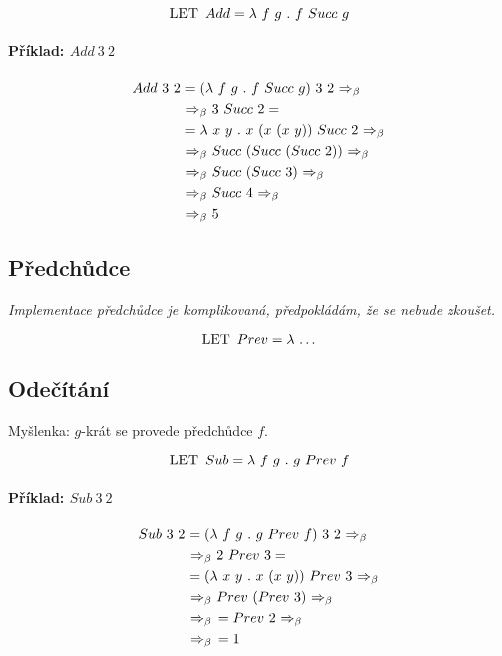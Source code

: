 $$ \lklet Add = \lk f ~ g \lkdot f ~ Succ ~ g $$

\paragraph*{Příklad: $Add ~ 3 ~ 2$}
\begin{equation}
    \begin{split}
        Add ~ 3 ~ 2 &= (\lk f ~ g \lkdot f ~ Succ ~ g) ~ 3 ~ 2 \lkbeta \\
        &\lkbeta 3 ~ Succ ~ 2 = \\
        &= \lk x ~ y \lkdot x ~ (x ~ (x ~ y)) ~ Succ ~ 2 \lkbeta \\
        &\lkbeta Succ ~ (Succ ~ (Succ ~ 2)) \lkbeta \\
        &\lkbeta Succ ~ (Succ ~ 3) \lkbeta \\
        &\lkbeta Succ ~ 4 \lkbeta \\
        &\lkbeta 5
    \end{split}
\end{equation}

\subsection{Předchůdce}

\begin{compactitem}
    \item \textit{Implementace předchůdce je komplikovaná, předpokládám, že se nebude zkoušet.}
\end{compactitem}

$$ \lklet Prev = \lk \dots $$

\subsection{Odečítání}

\begin{compactitem}
    \item Myšlenka: $g$-krát se provede předchůdce $f$.
\end{compactitem}

$$ \lklet Sub = \lk f ~ g \lkdot g ~ Prev ~ f $$

\paragraph*{Příklad: $Sub ~ 3 ~ 2$}
\begin{equation}
    \begin{split}
        Sub ~ 3 ~ 2 &= (\lk f ~ g \lkdot g ~ Prev ~ f) ~ 3 ~ 2 \lkbeta \\
        &\lkbeta 2 ~ Prev ~ 3 = \\
        &= (\lk x ~ y \lkdot x ~ (x ~ y)) ~ Prev ~ 3 \lkbeta \\
        &\lkbeta Prev ~ (Prev ~ 3) \lkbeta \\
        &\lkbeta= Prev ~ 2 \lkbeta \\
        &\lkbeta= 1
    \end{split}
\end{equation}
